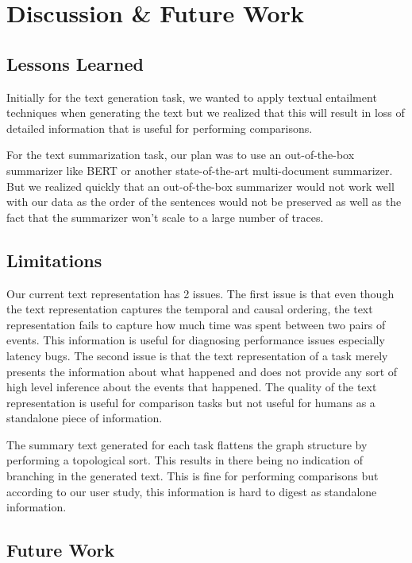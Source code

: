 \section{Discussion \& Future Work}
\label{sec:discussion}

\subsection{Lessons Learned}

Initially for the text generation task, we wanted to apply textual entailment techniques
when generating the text but we realized that this will result in loss of detailed information
that is useful for performing comparisons.

For the text summarization task, our plan was to use an out-of-the-box summarizer like BERT or
another state-of-the-art multi-document summarizer. But we realized quickly that an out-of-the-box
summarizer would not work well with our data as the order of the sentences would not be preserved
as well as the fact that the summarizer won't scale to a large number of traces.

\subsection{Limitations}

Our current text representation has 2 issues. The first issue is that even though the text representation
captures the temporal and causal ordering, the text representation fails to capture how much time was spent between
two pairs of events. This information is useful for diagnosing performance issues especially latency bugs.
The second issue is that the text representation of a task merely presents the information about what happened
and does not provide any sort of high level inference about the events that happened. The quality of the text representation
is useful for comparison tasks but not useful for humans as a standalone piece of information.

The summary text generated for each task flattens the graph structure by performing a topological sort.
This results in there being no indication of branching in the generated text. This is fine for performing
comparisons but according to our user study, this information is hard to digest as standalone information.

\subsection{Future Work}

